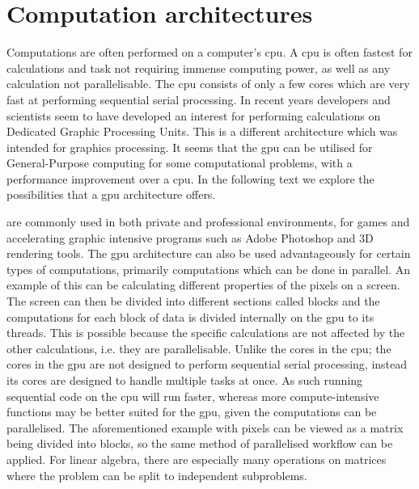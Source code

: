 \section{Computation architectures}
\label{sec:comparch}
Computations are often performed on a computer's  \acrshort{cpu}.
A \acrshort{cpu} is often fastest for calculations and task not requiring immense computing power, as well as any calculation not parallelisable.
The \acrshort{cpu} consists of only a few cores which are very fast at performing sequential serial processing. \citep{whatisgpu} 
In recent years developers and scientists seem to have developed an interest for performing calculations on Dedicated Graphic Processing Units. \citep{gpurise} 
This is a different architecture which was intended for graphics processing.
It seems that the \acrshort{gpu} can be utilised for General-Purpose computing for some computational problems, with a performance improvement over a \acrshort{cpu}.
In the following text we explore the possibilities that a \acrshort{gpu} architecture offers.

 are commonly used in both private and professional environments, for games and accelerating graphic intensive programs such as Adobe Photoshop and 3D rendering tools. \citep{NVIDIAADOBE,STEAMHW}
The \acrshort{gpu} architecture can also be used advantageously for certain types of computations, primarily computations which can be done in parallel. 
An example of this can be calculating different properties of the pixels on a screen. 
The screen can then be divided into different sections called blocks and the computations for each block of data is divided internally on the \acrshort{gpu} to its threads. 
This is possible because the specific calculations are not affected by the other calculations, i.e. they are parallelisable.
Unlike the cores in the \acrshort{cpu}; the cores in the \acrshort{gpu} are not designed to perform sequential serial processing, instead its cores are designed to handle multiple tasks at once. 
As such running sequential code on the \acrshort{cpu} will run faster, whereas more compute-intensive functions may be better suited for the \acrshort{gpu}, given the computations can be parallelised. \citep{NvidiaGPGPU}
The aforementioned example with pixels can be viewed as a matrix being divided into blocks, so the same method of parallelised workflow can be applied.
For linear algebra, there are especially many operations on matrices where the problem can be split to independent subproblems.

